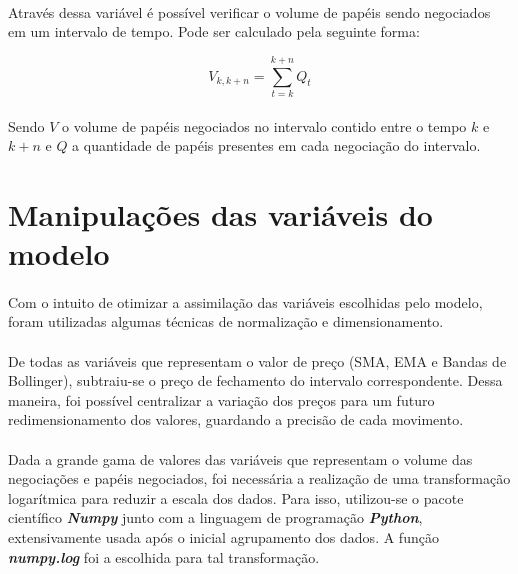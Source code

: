 \documentclass[grad,numbers]{coppe}
\begin{document}
            \paragraph{}Através dessa variável é possível verificar o volume de papéis sendo negociados em um intervalo de tempo. Pode ser calculado pela seguinte forma:
            
            \begin{equation}
                V_{k,k + n} = \sum_{t = k}^{k+n} Q_t
            \end{equation}
            
            \paragraph{}Sendo $V$ o volume de papéis negociados no intervalo contido entre o tempo $k$ e $k + n$ e $Q$ a quantidade de papéis presentes em cada negociação do intervalo.
            
            
        
      \section{Manipulações das variáveis do modelo}
      
        \paragraph{}Com o intuito de otimizar a assimilação das variáveis escolhidas pelo modelo, foram utilizadas algumas técnicas de normalização e dimensionamento.
        
        \paragraph{}De todas as variáveis que representam o valor de preço (SMA, EMA e Bandas de Bollinger), subtraiu-se o preço de fechamento do intervalo correspondente. Dessa maneira, foi possível  centralizar a variação dos preços para um futuro redimensionamento dos valores, guardando a precisão de cada movimento.
        
        \paragraph{}Dada a grande gama de valores das variáveis que representam o volume das negociações e papéis negociados, foi necessária a realização de uma transformação logarítmica para reduzir a escala dos dados. Para isso, utilizou-se o pacote científico \textbf{\textit{Numpy}} junto com a linguagem de programação \textbf{\textit{Python}}, extensivamente usada após o inicial agrupamento dos dados. A função \textbf{\textit{numpy.log}} foi a escolhida para tal transformação. 
        
\end{document}
